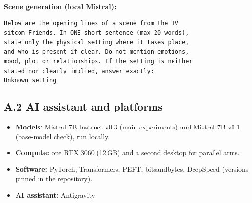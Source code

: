 \documentclass[lettersize,journal]{IEEEtran}
\begin{document}
\noindent\textbf{Scene generation (local Mistral):}
\begin{small}\begin{verbatim}
Below are the opening lines of a scene from the TV
sitcom Friends. In ONE short sentence (max 20 words),
state only the physical setting where it takes place,
and who is present if clear. Do not mention emotions,
mood, plot or relationships. If the setting is neither
stated nor clearly implied, answer exactly:
Unknown setting
\end{verbatim}\end{small}

\subsection*{A.2 AI assistant and platforms}
\begin{itemize}
\item \textbf{Models:} Mistral-7B-Instruct-v0.3 (main experiments) and Mistral-7B-v0.1 (base-model check), run locally.
\item \textbf{Compute:} one RTX 3060 (12\,GB) and a second desktop for parallel arms.
\item \textbf{Software:} PyTorch, Transformers, PEFT, bitsandbytes, DeepSpeed (versions pinned in the repository).
\item \textbf{AI assistant:} Antigravity
\end{itemize}
\end{document}
